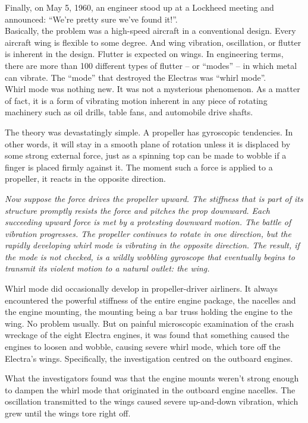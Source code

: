  Finally, on May 5, 1960, an engineer stood up at a Lockheed meeting and announced: ``We're pretty sure we've found it!''.  \\

Basically, the problem was a high-speed aircraft in a conventional design. 
Every aircraft wing is flexible to some degree. And wing vibration, oscillation, or flutter is inherent in the design. Flutter is expected on wings. In engineering terms, there are more than 100 different types of flutter -- or ``modes'' -- in which metal can vibrate. The ``mode'' that destroyed the Electras was ``whirl mode''. \\

Whirl mode was nothing new. It was not a mysterious phenomenon. As a matter of fact, it is a form of vibrating motion inherent in any piece of rotating machinery such as oil drills, table fans, and automobile drive shafts.

The theory was devastatingly simple. A propeller has gyroscopic tendencies. In other words, it will stay in a smooth plane of rotation unless it is displaced by some strong external force, just as a spinning top can be made to wobble if a finger is placed firmly against it. The moment such a force is applied to a propeller, it reacts in the opposite direction.

\emph{Now suppose the force drives the propeller upward. The stiffness that is part of its structure promptly resists the force and pitches the prop downward. Each succeeding upward force is met by a protesting downward motion. The battle of vibration progresses. The propeller continues to rotate in one direction, but the rapidly developing whirl mode is vibrating in the opposite direction. The result, if the mode is not checked, is a wildly wobbling gyroscope that eventually begins to transmit its violent motion to a natural outlet: the wing.}

Whirl mode did occasionally develop in propeller-driver airliners. It always encountered the powerful stiffness of the entire engine package, the nacelles and the engine mounting, the mounting being a bar truss holding the engine to the wing. No problem usually. But on painful microscopic examination of the crash wreckage of the eight Electra engines, it was found that something caused the engines to loosen and wobble, causing severe whirl mode, which tore off the Electra's wings. Specifically, the investigation centred on the outboard engines.

What the investigators found was that the engine mounts weren't strong enough to dampen the whirl mode that originated in the outboard engine nacelles. The oscillation transmitted to the wings caused severe up-and-down vibration, which grew until the wings tore right off. \hfill \\




